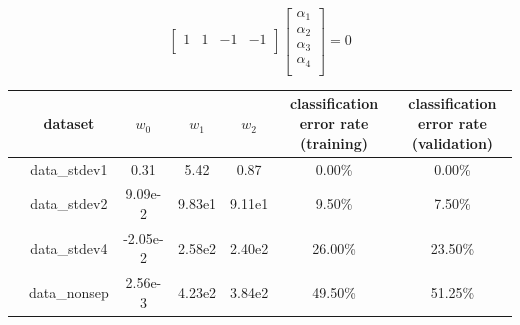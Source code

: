 \documentclass[10pt]{article}
\begin{document}
\[
\begin{bmatrix}
    1 & 1 & -1 & -1 \\
\end{bmatrix}
\begin{bmatrix}
    \alpha_1 \\
    \alpha_2 \\
    \alpha_3 \\
    \alpha_4 \\
\end{bmatrix} 
= 0
\]

\begin{table}
\begin{tabular}{c c|c|c|c|c|c}
\toprule
{} & dataset & $w_0$ & $w_1$ & $w_2$ & classification error rate (training) & classification error rate (validation) \\
\midrule
  & data\_stdev1 & 0.31 & 5.42 & 0.87 & 0.00\% & 0.00\% \\
  & data\_stdev2 & 9.09e-2 & 9.83e1 & 9.11e1 & 9.50\% & 7.50\% \\
  & data\_stdev4 & -2.05e-2 & 2.58e2 & 2.40e2 & 26.00\% & 23.50\% \\
  & data\_nonsep & 2.56e-3 & 4.23e2 & 3.84e2 & 49.50\% & 51.25\% \\
\bottomrule
\end{tabular}
\end{table}
\end{document}
